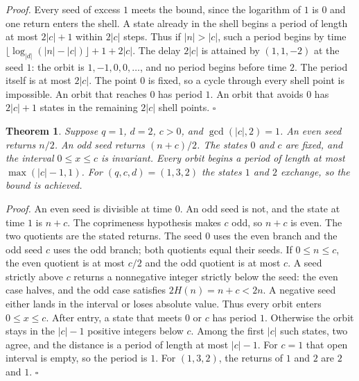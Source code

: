 \documentclass[11pt,letterpaper]{article}
\newtheorem{theorem}{Theorem}
\newenvironment{proof}{\noindent\textit{Proof.}}{\hfill\(\square\)}
\begin{document}
\begin{proof}
Every seed of excess \(1\) meets the bound, since the logarithm of \(1\) is \(0\) and one return enters the shell. A state already in the shell begins a period of length at most \(2\lvert c\rvert+1\) within \(2\lvert c\rvert\) steps. Thus if \(\lvert n\rvert>\lvert c\rvert\), such a period begins by time \(\lfloor\log_{\lvert d\rvert}(\lvert n\rvert-\lvert c\rvert)\rfloor+1+2\lvert c\rvert\). The delay \(2\lvert c\rvert\) is attained by \((1,1,-2)\) at the seed \(1\): the orbit is \(1,-1,0,0,\ldots\), and no period begins before time \(2\). The period itself is at most \(2\lvert c\rvert\). The point \(0\) is fixed, so a cycle through every shell point is impossible. An orbit that reaches \(0\) has period \(1\). An orbit that avoids \(0\) has \(2\lvert c\rvert+1\) states in the remaining \(2\lvert c\rvert\) shell points.
\end{proof}

\begin{theorem}
\label{thm:twopositive}
Suppose \(q=1\), \(d=2\), \(c>0\), and \(\gcd(\lvert c\rvert,2)=1\). An even seed returns \(n/2\). An odd seed returns \((n+c)/2\). The states \(0\) and \(c\) are fixed, and the interval \(0\le x\le c\) is invariant. Every orbit begins a period of length at most \(\max(\lvert c\rvert-1,1)\). For \((q,c,d)=(1,3,2)\) the states \(1\) and \(2\) exchange, so the bound is achieved.
\end{theorem}

\begin{proof}
An even seed is divisible at time \(0\). An odd seed is not, and the state at time \(1\) is \(n+c\). The coprimeness hypothesis makes \(c\) odd, so \(n+c\) is even. The two quotients are the stated returns. The seed \(0\) uses the even branch and the odd seed \(c\) uses the odd branch; both quotients equal their seeds. If \(0\le n\le c\), the even quotient is at most \(c/2\) and the odd quotient is at most \(c\). A seed strictly above \(c\) returns a nonnegative integer strictly below the seed: the even case halves, and the odd case satisfies \(2H(n)=n+c<2n\). A negative seed either lands in the interval or loses absolute value. Thus every orbit enters \(0\le x\le c\). After entry, a state that meets \(0\) or \(c\) has period \(1\). Otherwise the orbit stays in the \(\lvert c\rvert-1\) positive integers below \(c\). Among the first \(\lvert c\rvert\) such states, two agree, and the distance is a period of length at most \(\lvert c\rvert-1\). For \(c=1\) that open interval is empty, so the period is \(1\). For \((1,3,2)\), the returns of \(1\) and \(2\) are \(2\) and \(1\).
\end{proof}
\end{document}
